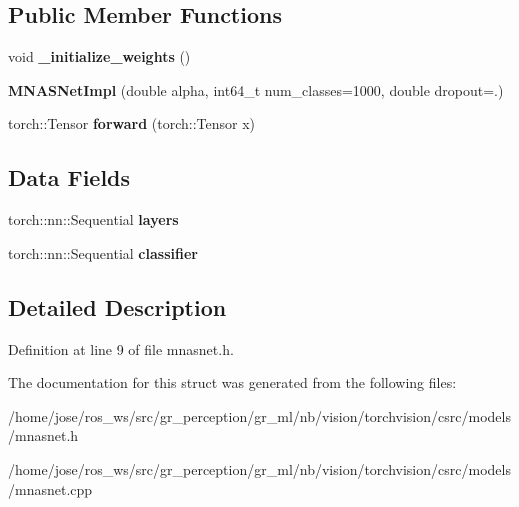 \subsection*{Public Member Functions}
\begin{DoxyCompactItemize}
\item 
\mbox{\label{structvision_1_1models_1_1MNASNetImpl_ad4b023dd7d68b31157b7ec1cf7de9079}} 
void {\bfseries \+\_\+initialize\+\_\+weights} ()
\item 
\mbox{\label{structvision_1_1models_1_1MNASNetImpl_a6234c214ea110ece02b0875c4c423a16}} 
{\bfseries M\+N\+A\+S\+Net\+Impl} (double alpha, int64\+\_\+t num\+\_\+classes=1000, double dropout=.)
\item 
\mbox{\label{structvision_1_1models_1_1MNASNetImpl_a5fc520cbc6bd8ebe35d836d8856a1a0a}} 
torch\+::\+Tensor {\bfseries forward} (torch\+::\+Tensor x)
\end{DoxyCompactItemize}
\subsection*{Data Fields}
\begin{DoxyCompactItemize}
\item 
\mbox{\label{structvision_1_1models_1_1MNASNetImpl_a1b7abc34b066958d70bf98ee6fc0e73a}} 
torch\+::nn\+::\+Sequential {\bfseries layers}
\item 
\mbox{\label{structvision_1_1models_1_1MNASNetImpl_a3febd8f6a7fa722458644699d1d1320c}} 
torch\+::nn\+::\+Sequential {\bfseries classifier}
\end{DoxyCompactItemize}


\subsection{Detailed Description}


Definition at line 9 of file mnasnet.\+h.



The documentation for this struct was generated from the following files\+:\begin{DoxyCompactItemize}
\item 
/home/jose/ros\+\_\+ws/src/gr\+\_\+perception/gr\+\_\+ml/nb/vision/torchvision/csrc/models/mnasnet.\+h\item 
/home/jose/ros\+\_\+ws/src/gr\+\_\+perception/gr\+\_\+ml/nb/vision/torchvision/csrc/models/mnasnet.\+cpp\end{DoxyCompactItemize}
